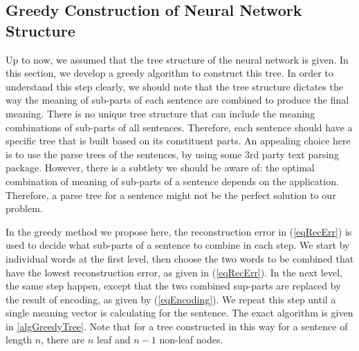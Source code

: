 \documentclass[twoside,12pt]{article}
\begin{document}
\subsection{Greedy Construction of Neural Network Structure}
Up to now, we assumed that the tree structure of the neural network is given. In this section, we develop a greedy algorithm to construct this tree. In order to understand this step clearly, we should note that the tree structure dictates the way the meaning of sub-parts of each sentence are combined to produce the final meaning. There is no unique tree structure that can include the meaning combinations of sub-parts of all sentences. Therefore, each sentence should have a specific tree that is built based on its constituent parts. An appealing choice here is to use the parse trees of the sentences,  by using some 3rd party text parsing package. However, there is a subtlety we should be aware of: the optimal combination of meaning of sub-parts of a sentence depends on the application. Therefore, a parse tree for a sentence might not be the perfect solution to our problem.

In the greedy method we propose here, the reconstruction error in (\ref{eqRecErr}) is used to decide what sub-parts of a sentence to combine in each step. We start by individual words at the first level, then choose the two words to be combined that have the lowest reconstruction error, as given in (\ref{eqRecErr}). In the next level, the same step happen, except that the two combined sup-parts are replaced by the result of encoding, as given by (\ref{eqEncoding}). We repeat this step until a single meaning vector is calculating for the sentence. The exact algorithm is given in \ref{algGreedyTree}. Note that for a tree constructed in this way for a sentence of length $n$, there are $n$ leaf and $n-1$ non-leaf nodes.
\end{document}
